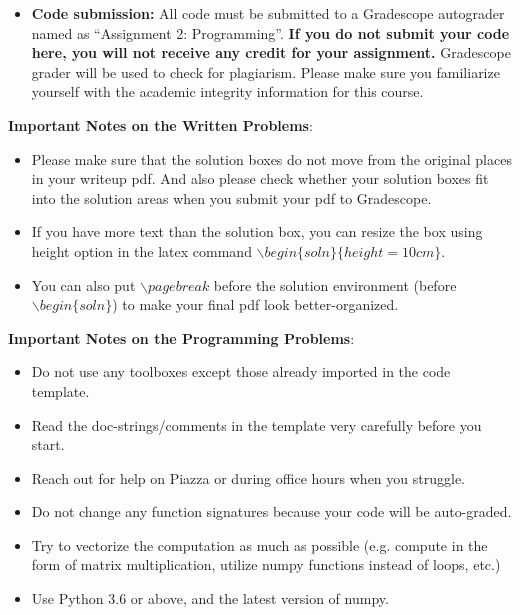 \begin{itemize}
\begin{itemize}
        \item \textbf{Code submission:} All code must be submitted to a Gradescope autograder named as ``Assignment 2: Programming''.  \textbf{If you do not submit your code here, you will not receive any credit for your assignment.} Gradescope grader will be used to check for plagiarism.  Please make sure you familiarize yourself with the academic integrity information for this course.
    \end{itemize}

\end{itemize}

\textbf{Important Notes on the Written Problems}:
\begin{itemize}
    \item Please make sure that the solution boxes do not move from the original places in your writeup pdf. And also please check whether your solution boxes fit into the solution areas when you submit your pdf to Gradescope. 
    \item If you have more text than the solution box, you can resize the box using height option in the latex command $\backslash begin\{soln\}\{height=10cm\}$.
    \item You can also put $\backslash pagebreak$ before the solution environment (before $\backslash begin\{soln\}$) to make your final pdf look better-organized.
\end{itemize}

\textbf{Important Notes on the Programming Problems}:
\begin{itemize}
    \item Do not use any toolboxes except those already imported in the code template. 
    \item Read the doc-strings/comments in the template very carefully before you start. 
    \item Reach out for help on Piazza or during office hours when you struggle. 
    \item Do not change any function signatures because your code will be auto-graded. 
    \item Try to vectorize the computation as much as possible (e.g. compute in the form of matrix multiplication, utilize numpy functions instead of loops, etc.)
    \item Use Python 3.6 or above, and the latest version of numpy.
\end{itemize}